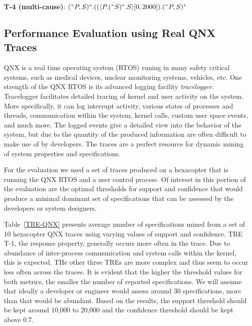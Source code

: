 \documentclass[]{sigplanconf}
\begin{document}
\noindent \textbf{T-4 (multi-cause)}: $(\verb!^!P,S)^*.((\langle P.(\verb!^!S)^*.S\rangle[0, 2000]).(\verb!^!P,S)^*$


\subsection{Performance Evaluation using Real QNX Traces}

QNX is a real time operating system (RTOS) runing in many safety critical systems, such as medical devices, nuclear monitoring systems, vehicles, etc. One strength of the QNX RTOS is its advanced logging facility \emph{tracelogger}. Tracelogger facilitates detailed tracing of kernel and user activity on the system. More specifically, it can log interrupt activity, various states of processes and threads, communication within the system, kernel calls, custom user space events, and much more. The logged events give a detailed view into the behavior of the system, but due to the quantity of the produced information are often difficult to make use of by developers. The traces are a perfect resource for dynamic mining of system properties and specifications.

For the evaluation we used a set of traces produced on a hexacopter that is running the QNX RTOS and a user control process. Of interest in this portion of the evaluation are the optimal thresholds for support and confidence that would produce a minimal dominant set of specifications that can be assessed by the developers or system designers.


Table~\ref{TRE-QNX} presents average number of specifications mined from a set of 10 hexacopter QNX traces using varying values of support and confidence. TRE T-1, the response property, generally occurs more often in the trace. Due to abundance of inter-process communication and system calls within the kernel, this is expected. THe other three TREs are more complex and thus seem to occur less often across the traces. It is evident that the higher the threshold values for both metrics, the smaller the number of reported specifications. We will assume that ideally a developer or engineer would assess around 30 specifications, more than that would be abundant. Based on the results, the support threshold should be kept around 10,000 to 20,000 and the confidence threshold should be kept above 0.7.
\end{document}
